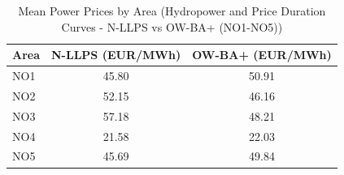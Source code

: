 \begin{table}[htbp]
\centering
\caption{Mean Power Prices by Area (Hydropower and Price Duration Curves - N-LLPS vs OW-BA+ (NO1-NO5))}
\label{tab:mean_prices_NO_areas_N_LLPS_OW_BA_plus}
\begin{tabular}{lcc}
\hline
Area & N-LLPS (EUR/MWh) & OW-BA+ (EUR/MWh) \\
\hline
NO1 & 45.80 & 50.91 \\
NO2 & 52.15 & 46.16 \\
NO3 & 57.18 & 48.21 \\
NO4 & 21.58 & 22.03 \\
NO5 & 45.69 & 49.84 \\
\hline
\end{tabular}
\end{table}